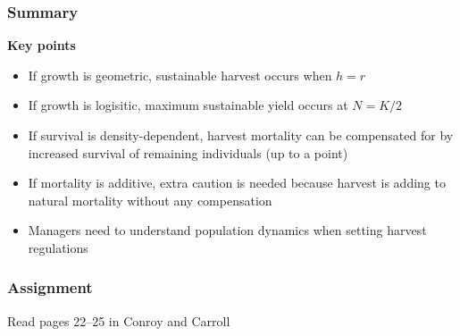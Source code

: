 \documentclass[color=usenames,dvipsnames,handout]{beamer}\usepackage[]{graphicx}\usepackage[]{color}
\begin{document}
\begin{frame}
  \frametitle{Summary}
  {\bf Key points}
  \begin{itemize}
    \item If growth is geometric, sustainable harvest occurs when $h=r$
    \item If growth is logisitic, maximum sustainable yield occurs at $N=K/2$
    \item If survival is density-dependent, harvest mortality can be
      compensated for by increased survival of remaining individuals
      (up to a point)
    \item If mortality is additive, extra caution is needed
      because harvest is adding to natural mortality without any
      compensation
    \item Managers need to understand population dynamics when setting
      harvest regulations
  \end{itemize}
\end{frame}



\begin{frame}
  \frametitle{Assignment}
  \huge \centering
  Read pages 22--25 in Conroy and Carroll
\end{frame}




\end{document}

